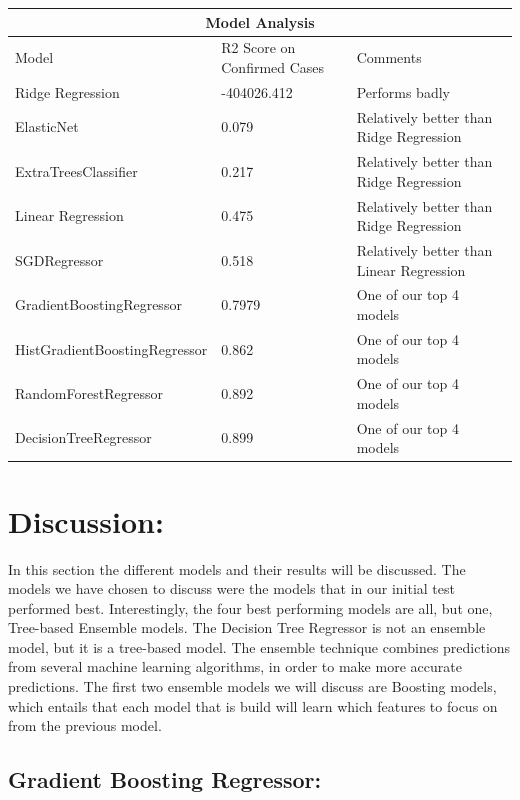 \documentclass{article}
\begin{document}
\begin{tabular}{ |p{5cm}||p{5cm}||p{5cm}|  }
 \hline
 \multicolumn{3}{|c|}{Model Analysis} \\
 \hline
 \hline
Model   & R2 Score on Confirmed Cases & Comments\\
 \hline
 \hline
 Ridge Regression   & -404026.412 & Performs badly  \\
   \hline
 ElasticNet  & 0.079 & Relatively better than Ridge Regression \\
  \hline
   ExtraTreesClassifier & 0.217 & Relatively better than Ridge Regression \\
 \hline
  Linear Regression   & 0.475 & Relatively better than Ridge Regression \\
  \hline
SGDRegressor   & 0.518 & Relatively better than Linear Regression \\
  \hline
  GradientBoostingRegressor & 0.7979 &  One of our top 4 models \\
   \hline
  HistGradientBoostingRegressor & 0.862 &  One of our top 4 models \\
  \hline
  RandomForestRegressor & 0.892 &  One of our top 4 models \\
  \hline
   DecisionTreeRegressor & 0.899&  One of our top 4 models \\
  \hline
\end{tabular}

\section{Discussion:}

In this section the different models and their results will be discussed. The models we have chosen to discuss were the models that in our initial test performed best. Interestingly, the four best performing models are all, but one, Tree-based Ensemble models. The Decision Tree Regressor is not an ensemble model, but it is a tree-based model. The ensemble technique combines predictions from several machine learning algorithms, in order to make more accurate predictions. 
The first two ensemble models we will discuss are Boosting models, which entails that each model that is build will learn which features to focus on from the previous model. 

\subsection{Gradient Boosting Regressor:}
\end{document}
